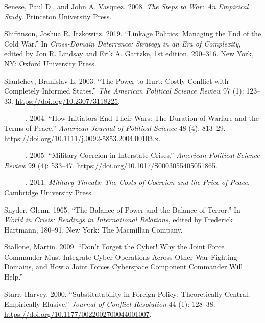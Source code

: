 \documentclass[
]{article}
\begin{document}
\leavevmode\hypertarget{ref-senese_stepswarempirical_2008}{}%
Senese, Paul D., and John A. Vasquez. 2008. \emph{The Steps to War: An Empirical Study}. Princeton University Press.

\leavevmode\hypertarget{ref-shifrinson_linkagepoliticsmanaging_2019}{}%
Shifrinson, Joshua R. Itzkowitz. 2019. ``Linkage Politics: Managing the End of the Cold War.'' In \emph{Cross-Domain Deterrence: Strategy in an Era of Complexity}, edited by Jon R. Lindsay and Erik A. Gartzke, 1st edition, 290--316. New York, NY: Oxford University Press.

\leavevmode\hypertarget{ref-slantchev_powerhurtcostly_2003}{}%
Slantchev, Branislav L. 2003. ``The Power to Hurt: Costly Conflict with Completely Informed States.'' \emph{The American Political Science Review} 97 (1): 123--33. \url{https://doi.org/10.2307/3118225}.

\leavevmode\hypertarget{ref-slantchev_howinitiatorsend_2004}{}%
---------. 2004. ``How Initiators End Their Wars: The Duration of Warfare and the Terms of Peace.'' \emph{American Journal of Political Science} 48 (4): 813--29. \url{https://doi.org/10.1111/j.0092-5853.2004.00103.x}.

\leavevmode\hypertarget{ref-slantchev_militarycoercioninterstate_2005}{}%
---------. 2005. ``Military Coercion in Interstate Crises.'' \emph{American Political Science Review} 99 (4): 533--47. \url{https://doi.org/10.1017/S0003055405051865}.

\leavevmode\hypertarget{ref-slantchev_militarythreatscosts_2011}{}%
---------. 2011. \emph{Military Threats: The Costs of Coercion and the Price of Peace}. Cambridge University Press.

\leavevmode\hypertarget{ref-snyder_balancepowerbalance_1965}{}%
Snyder, Glenn. 1965. ``The Balance of Power and the Balance of Terror.'' In \emph{World in Crisis: Readings in International Relations}, edited by Frederick Hartmann, 180--91. New York: The Macmillan Company.

\leavevmode\hypertarget{ref-stallone_donforgetcyber_2009}{}%
Stallone, Martin. 2009. ``Don't Forget the Cyber! Why the Joint Force Commander Must Integrate Cyber Operations Across Other War Fighting Domains, and How a Joint Forces Cyberspace Component Commander Will Help.''

\leavevmode\hypertarget{ref-starr_substitutabilityforeignpolicy_2000}{}%
Starr, Harvey. 2000. ``Substitutability in Foreign Policy: Theoretically Central, Empirically Elusive.'' \emph{Journal of Conflict Resolution} 44 (1): 128--38. \url{https://doi.org/10.1177/0022002700044001007}.
\end{document}

